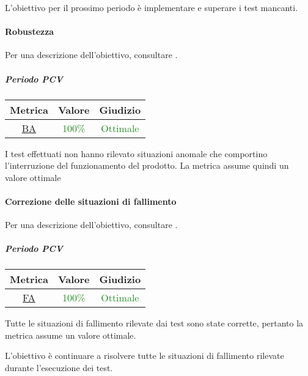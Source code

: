 				L'obiettivo per il prossimo periodo è implementare e superare i test mancanti.
				
				\newpage
			\paragraph{Robustezza}
			Per una descrizione dell'obiettivo, consultare .
				\subparagraph{Periodo PCV}
				
				\begin{table}[H]
					\centering
					\begin{tabular}{  c | c | c}
						\hline
						\textbf{Metrica} & \textbf{Valore} & \textbf{Giudizio} \\
						\hline
						\hyperref[MMC]{BA}   & \textcolor{ForestGreen}{100\%}          & \textcolor{ForestGreen}{Ottimale}  \\ \hline
					\end{tabular} 
				\end{table}
			I test effettuati non hanno rilevato situazioni anomale che comportino l'interruzione del funzionamento del prodotto. La metrica assume quindi un valore ottimale
			
			\newpage
			\paragraph{Correzione delle situazioni di fallimento}
			Per una descrizione dell'obiettivo, consultare .
				\subparagraph{Periodo PCV}
				
				\begin{table}[H]
					\centering
					\begin{tabular}{  c | c | c}
						\hline
						\textbf{Metrica} & \textbf{Valore} & \textbf{Giudizio} \\
						\hline
						\hyperref[MMC]{FA}   & \textcolor{ForestGreen}{100\%}          & \textcolor{ForestGreen}{Ottimale}  \\ \hline
					\end{tabular} 
				\end{table}
			
			Tutte le situazioni di fallimento rilevate dai test sono state corrette, pertanto la metrica assume un valore ottimale.
			
			L'obiettivo è continuare a risolvere tutte le situazioni di fallimento rilevate durante l'esecuzione dei test.
			
			\newpage
